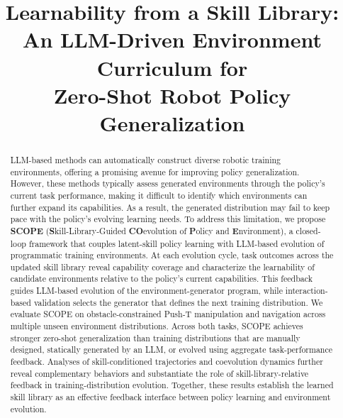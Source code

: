 \documentclass[conference]{IEEEtran}
\begin{document}
\title{Learnability from a Skill Library:\\
An LLM-Driven Environment Curriculum for\\ Zero-Shot Robot Policy Generalization}

\author{
}

\maketitle

\begin{abstract}
LLM-based methods can automatically construct diverse robotic training
environments, offering a promising avenue for improving policy generalization.
However, these methods typically assess generated environments through the
policy's current task performance, making it difficult to identify which
environments can further expand its capabilities. As a result, the generated
distribution may fail to keep pace with the policy's evolving learning needs.
To address this limitation, we propose \textbf{SCOPE}
(\textbf{S}kill-Library-Guided \textbf{CO}evolution of \textbf{P}olicy and
\textbf{E}nvironment), a closed-loop framework that couples latent-skill policy
learning with LLM-based evolution of programmatic training environments. At
each evolution cycle, task outcomes across the updated skill library reveal
capability coverage and characterize the learnability of candidate environments
relative to the policy's current capabilities. This feedback guides LLM-based
evolution of the environment-generator program, while interaction-based
validation selects the generator that defines the next training distribution.
We evaluate SCOPE on obstacle-constrained Push-T manipulation and navigation
across multiple unseen environment distributions. Across both tasks, SCOPE
achieves stronger zero-shot generalization than training distributions that are
manually designed, statically generated by an LLM, or evolved using aggregate
task-performance feedback. Analyses of skill-conditioned trajectories and
coevolution dynamics further reveal complementary behaviors and substantiate
the role of skill-library-relative feedback in training-distribution evolution.
Together, these results establish the learned skill library as an effective
feedback interface between policy learning and environment evolution.
\end{abstract}
\end{document}
